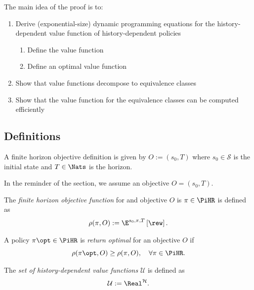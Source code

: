 The main idea of the proof is to:
\begin{enumerate}
\item Derive (exponential-size) dynamic programming equations for the history-dependent value function of history-dependent policies
  \begin{enumerate}
    \item Define the value function
    \item Define an optimal value function
  \end{enumerate}
\item Show that value functions decompose to equivalence classes
\item Show that the value function for the equivalence classes can be computed efficiently
\end{enumerate}

\subsection{Definitions}

\begin{definition} \label{def:ObjectiveFH}
  A finite horizon objective definition is given by $O := (s_0, T)$ where $s_0\in \mathcal{S}$ is the initial state and $T\in \Nats$ is the horizon.
\end{definition}

In the reminder of the section, we assume an objective $O = (s_0, T)$.
\begin{definition} \label{sec:objective-fh}
  The \emph{finite horizon objective function} for and objective $O$ is $\pi\in \PiHR$ is defined as
  \[
    \rho(\pi, O)
    :=
    \E^{s_0, \pi, T} \left[\rew \right].
  \]
\end{definition}

\begin{definition}\label{def:optimal-fh}
  A policy $\pi\opt\in \PiHR$ is \emph{return optimal} for an objective $O$ if
  \[
   \rho(\pi\opt, O) \ge \rho(\pi, O), \quad \forall \pi \in \PiHR.
 \]
\end{definition}

\begin{definition} \label{def:values-h}
  The \emph{set of history-dependent value functions} $\mathcal{U}$ is defined as
  \[
   \mathcal{U} := \Real^{\mathcal{H}}.
 \]
\end{definition}


